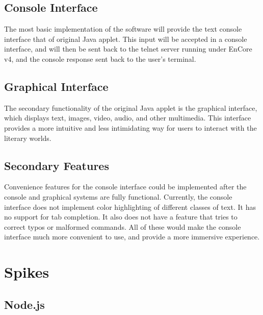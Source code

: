 \documentclass[12pt, letterpaper]{report}
\begin{document}
\section{Console Interface}
The most basic implementation of the software will provide the text console interface that of original Java applet. This input will be accepted in a console interface, and will then be sent back to the telnet server running under EnCore v4, and the console response sent back to the user's terminal.

\section{Graphical Interface}
The secondary functionality of the original Java applet is the graphical interface, which displays text, images, video, audio, and other multimedia. This interface provides a more intuitive and less intimidating way for users to interact with the literary worlds. 

\section{Secondary Features}
Convenience features for the console interface could be implemented after the console and graphical systems are fully functional. Currently, the console interface does not implement color highlighting of different classes of text. It has no support for tab completion. It also does not have a feature that tries to correct typos or malformed commands. All of these would make the console interface much more convenient to use, and provide a more immersive experience.

\par



\chapter{Spikes}
\section{Node.js}


\end{document}
